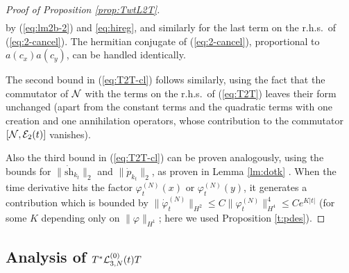 \documentclass[11pt,a4paper]{article}
\newcommand{\cE}{{\cal E}}
\newcommand{\cL}{{\cal L}}
\newcommand{\cN}{{\cal N}}
\newcommand{\norm}[1]{\lVert#1\rVert}	%
\begin{document}
\begin{proof}[Proof of Proposition \ref{prop:TwtL2T}]
\[\begin{split}
\end{split} \]
by (\ref{eq:lm2b-2}) and \eqref{eq:hireg}, and similarly for the last term on the r.h.s.\ of (\ref{eq:2-cancel}).
The hermitian conjugate of (\ref{eq:2-cancel}), proportional to $a (c_x) a (c_y)$, can be handled identically. 

The second bound in (\ref{eq:T2T-cl}) follows similarly, using the fact that the commutator of $\cN$ with the terms on the r.h.s.\ of (\ref{eq:T2T}) leaves their form unchanged (apart from the constant terms and the quadratic terms with one creation and one annihilation operators, whose contribution to the commutator $[\cN , \cE_2 (t)]$ vanishes).  

Also the third bound in (\ref{eq:T2T-cl}) can be proven analogously, using
the bounds for $\| \dot{\text{sh}}_{k_t} \|_2$ and $\| \dot{p}_{k_t} \|_2$, as proven in Lemma \ref{lm:dotk} . When the time derivative hits the factor $\varphi_t^{(N)} (x)$ or $\varphi_t^{(N)} (y)$, it generates a contribution which is bounded by $\| \dot\varphi_t^{(N)} \|_{H^2} \leq C \| \varphi_t^{(N)} \|_{H^4}^4 \leq C e^{K|t|}$ (for some $K$ depending only on $\norm{\varphi}_{H^1}$; here we used Proposition \ref{t:pdes}).
\end{proof}

\subsection{Analysis of $T^* \cL^{(0)}_{3,N} (t) T$}
\end{document}
